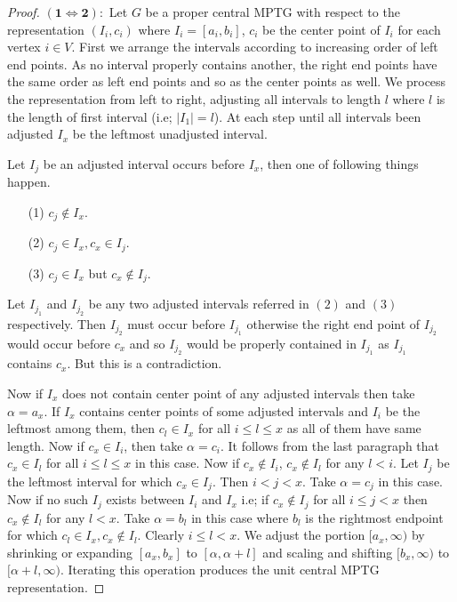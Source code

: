 \documentclass{article}
\theoremstyle{definition}
\numberwithin{equation}{section}
\begin{document}
\begin{proof}
$\mathbf{(1\Longleftrightarrow 2):}$ Let $G$ be a proper central MPTG with respect to the representation $(I_{i},c_{i})$ where $I_{i}=[a_{i},b_{i}]$, $c_{i}$ be the center point of $I_{i}$ for each vertex $i\in V$. First we arrange the intervals according to increasing order of left end points. As no interval properly contains another, the right end points have the same order as left end points and so as the center points as well. We process the representation from left to right, adjusting all intervals to length $l$ where $l$ is the length of first interval (i.e; $|I_{1}|=l$). At each step until all intervals been adjusted $I_{x}$ be the leftmost unadjusted interval.

\noindent Let $I_{j}$ be an adjusted interval occurs before $I_{x}$, then one of following things happen.

\begin{enumerate}
\item[(1)] $c_{j}\notin I_{x}$.

\item[(2)] $c_{j}\in I_{x},c_{x}\in I_{j}$.

\item[(3)] $c_{j}\in I_{x}$ but $c_{x}\notin I_{j}$.
\end{enumerate}

\noindent Let $I_{j_{1}}$ and $I_{j_{2}}$ be any two adjusted intervals referred in $(2)$ and $(3)$ respectively. Then $I_{j_{2}}$ must occur before $I_{j_{1}}$ otherwise the right end point of $I_{j_{2}}$ would occur before $c_{x}$ and so $I_{j_{2}}$ would be properly contained in $I_{j_{1}}$ as $I_{j_{1}}$ contains $c_{x}$. But this is a contradiction.

\noindent Now if $I_{x}$ does not contain center point of any adjusted intervals then take 
$\alpha=a_{x}$. If $I_{x}$ contains center points of some adjusted intervals and $I_{i}$ be the leftmost among them, then $c_{l}\in I_{x}$ for all $i\leq l\leq x$ as all of them have same length. Now if $c_{x}\in I_{i}$, then take $\alpha=c_{i}$. It follows from the last paragraph that $c_{x}\in I_{l}$ for all $i\leq l\leq x$ in this case. Now if $c_{x}\notin I_{i}$, $c_{x}\notin I_{l}$ for any $l<i$. Let $I_{j}$ be the leftmost interval for which $c_{x}\in I_{j}$. Then $i<j<x$. Take $\alpha=c_{j}$ in this case. Now if no such $I_{j}$ exists between $I_{i}$ and $I_{x}$ i.e; if $c_{x}\notin I_{j}$ for all $i\leq j<x$ then $c_{x}\notin I_{l}$ for any $l<x$. Take $\alpha=b_{l}$ in this case where $b_{l}$ is the rightmost endpoint for which $c_{l}\in I_{x},c_{x}\notin I_{l}$. Clearly $i\leq l<x$. We adjust the portion $[a_{x},\infty)$ by shrinking or expanding $[a_{x},b_{x}]$ to $[\alpha,\alpha+l]$ and scaling and shifting $[b_{x},\infty)$ to $[\alpha+l,\infty)$. Iterating this operation produces the unit central MPTG representation.


\end{proof}
\end{document}
